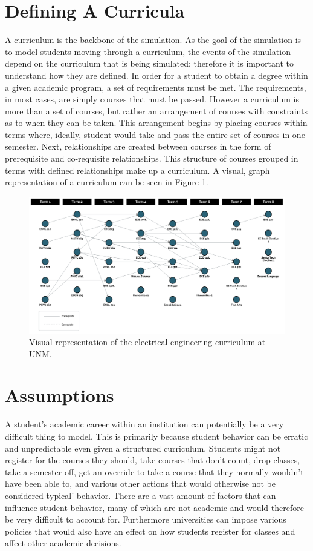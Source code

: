\documentclass[botnum, fleqn]{unmeethesis}
\begin{document}
\section{Defining A Curricula}
A curriculum is the backbone of the simulation. As the goal of the simulation is to model students moving through a curriculum, the events of the simulation depend on the curriculum that is being simulated; therefore it is important to understand how they are defined. In order for a student to obtain a degree within a given academic program, a set of requirements must be met. The requirements, in most cases, are simply courses that must be passed. However a curriculum is more than a set of courses, but rather an arrangement of courses with constraints as to when they can be taken. This arrangement begins by placing courses within terms where, ideally, student would take and pass the entire set of courses in one semester. Next, relationships are created between courses in the form of prerequisite and co-requisite relationships. This structure of courses grouped in terms with defined relationships make up a curriculum. A visual, graph representation of a curriculum can be seen in Figure \ref{fig:curriculum_example}.

\begin{figure}[h!]
\centerline{\includegraphics[scale=0.4]{./figures/curriculum_example.jpg}}
\caption{Visual representation of the electrical engineering curriculum at UNM.} 
\label{fig:curriculum_example}
\end{figure}


\section{Assumptions}
A student's academic career within an institution can potentially be a very difficult thing to model. This is primarily because student behavior can be erratic and unpredictable even given a structured curriculum. Students might not register for the courses they should, take courses that don't count, drop classes, take a semester off, get an override to take a course that they normally wouldn't have been able to, and various other actions that would otherwise not be considered \'typical' behavior. There are a vast amount of factors that can influence student behavior, many of which are not academic and would therefore be very difficult to account for. Furthermore universities can impose various policies that would also have an effect on how students register for classes and affect other academic decisions. 
\end{document}
